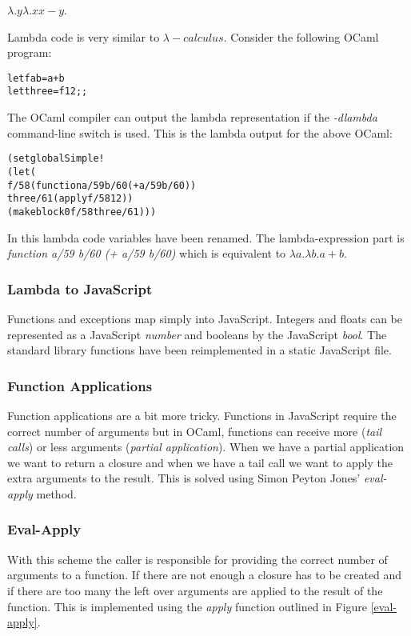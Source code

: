 $\lambda.y \lambda.x x - y$.

Lambda code is very similar to $\lambda-calculus$. Consider the following OCaml program:

\begin{alltt}
let f a b = a+b
let three = f 1 2;;
\end{alltt}

The OCaml compiler can output the lambda representation if the \emph{-dlambda} command-line switch is used. This is the lambda output for the above OCaml:

\begin{alltt}
  (setglobal Simple!
  (let (
  f/58 (function a/59 b/60 (+ a/59 b/60))
  three/61 (apply f/58 1 2))
  (makeblock 0 f/58 three/61)))
\end{alltt}

In this lambda code variables have been renamed. The lambda-expression part is \emph{function a/59 b/60 (+ a/59 b/60)} which is equivalent to \texttt{$\lambda a.\lambda b.a+b$}.

\subsubsection{Lambda to JavaScript}
Functions and exceptions map simply into JavaScript. Integers and floats can be represented as a JavaScript \emph{number} and booleans by the JavaScript \emph{bool}. The standard library functions have been reimplemented in a static JavaScript file.\cite{bib:js_comp}

\subsubsection{Function Applications}
Function applications are a bit more tricky. Functions in JavaScript require the correct number of arguments but in OCaml, functions can receive more (\emph{tail calls}) or less arguments (\emph{partial application}). When we have a partial application we want to return a closure and when we have a tail call we want to apply the extra arguments to the result. This is solved using Simon Peyton Jones' \emph{eval-apply} method.\cite{bib:js_comp,bib:krivines_machine}

\subsubsection{Eval-Apply}
With this scheme the caller is responsible for providing the correct number of arguments to a function. If there are not enough a closure has to be created and if there are too many the left over arguments are applied to the result of the function. This is implemented using the \emph{apply} function outlined in Figure \ref{eval-apply}.\cite{bib:krivines_machine}

